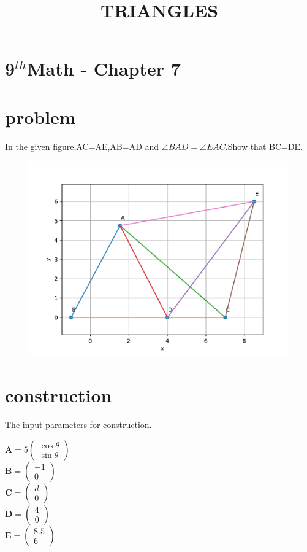 \documentclass[10pt]{article}
\newcommand{\myvec}[1]{\ensuremath{\begin{pmatrix}#1\end{pmatrix}}}
\let\vec\mathbf{}
\begin{document}
\begin{center}
\title{\textbf{TRIANGLES}}
\date{\vspace{-5ex}}
\maketitle
\end{center}
\section*{9$^{th}$Math - Chapter 7}
\section{problem}
In the given figure,AC=AE,AB=AD and $\angle BAD=\angle EAC$.Show that BC=DE.
\begin{figure}[!h]
	\begin{center}
	\includegraphics[width=5in]{./fig/fig.pdf}
	\end{center}
\caption{}
\label{figure}
\end{figure}
\section{construction}
The input parameters for construction.\\

\begin{table}[!h]
\centering

\caption{}
\label{Inputs}
\end{table}
\begin{center}
$\vec{A}=5\myvec{\cos\theta\\\sin\theta}$\\
$\vec{B}=\myvec{-1\\0}$\\
$\vec{C}=\myvec{d\\0}$\\
$\vec{D}=\myvec{4\\0}$\\
$\vec{E}=\myvec{8.5\\6}$\\
\end{center}
\end{document}
